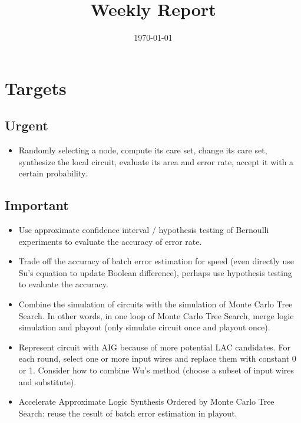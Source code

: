 \documentclass{article}
\title{Weekly Report}
\author{}
\date{\today}
\begin{document}
\maketitle

\section{Targets}

\subsection{Urgent}
\begin{itemize}
    \item Randomly selecting a node,
        compute its care set,
        change its care set,
        synthesize the local circuit,
        evaluate its area and error rate,
        accept it with a certain probability.
\end{itemize}

\subsection{Important}
\begin{itemize}
    \item Use approximate confidence interval / hypothesis testing of Bernoulli experiments to evaluate the accuracy of error rate.
    \item Trade off the accuracy of batch error estimation for speed
        (even directly use Su's equation to update Boolean difference),
        perhaps use hypothesis testing to evaluate the accuracy.
    \item Combine the simulation of circuits with the simulation of Monte Carlo Tree Search.
        In other words,
        in one loop of Monte Carlo Tree Search,
        merge logic simulation and playout (only simulate circuit once and playout once).
    \item Represent circuit with AIG because of more potential LAC candidates.
        For each round, select one or more input wires and replace them with constant 0 or 1.
        Consider how to combine Wu's method (choose a subset of input wires and substitute).
    \item Accelerate Approximate Logic Synthesis Ordered by Monte Carlo Tree Search:
        reuse the result of batch error estimation in playout.
\end{itemize}
\end{document}
